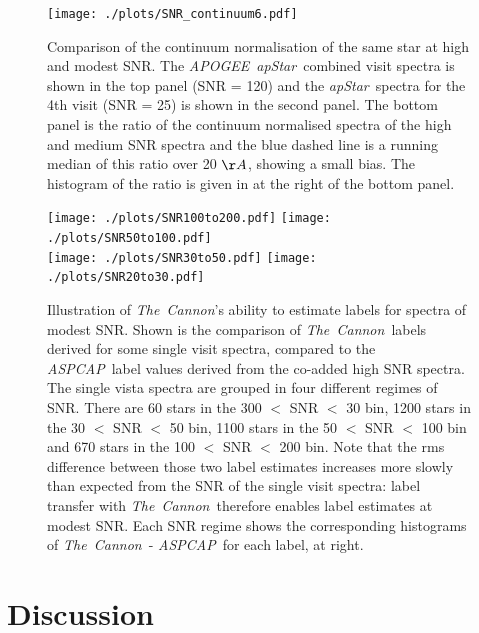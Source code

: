 \documentclass[12pt, preprint]{aastex}
\newcommand{\tc}{\textsl{The~Cannon}}
\newcommand{\apogee}{\textsl{APOGEE}}
\newcommand{\aspcap}{\textsl{ASPCAP}}
\newcommand{\apstar}{\textsl{apStar}}
\begin{document}
 \begin{figure}[!h]
  \texttt{[image: ./plots/SNR\_continuum6.pdf]}
  \caption{Comparison of the continuum normalisation of the same star at high and modest SNR. The \apogee\ \apstar\ combined visit spectra is shown in the top panel (SNR = 120) and the \apstar\ spectra for the 4th visit (SNR = 25) is shown in the second panel. The bottom panel is the ratio of the continuum normalised spectra of the high and medium SNR spectra and the blue dashed line is a running median of this ratio over 20 $\AA$, showing a small bias. The histogram of the ratio is given in at the right of the bottom panel.}
\label{fig:lowsnr}
\end{figure}

\begin{figure}[!h]
\centering
\texttt{[image: ./plots/SNR100to200.pdf]}
\texttt{[image: ./plots/SNR50to100.pdf]}\\
\texttt{[image: ./plots/SNR30to50.pdf]}
\texttt{[image: ./plots/SNR20to30.pdf]}
    \caption{Illustration of \tc's ability to estimate labels for spectra of modest SNR. Shown is the comparison of \tc\ labels derived for some single visit spectra, compared to the \aspcap\ label values derived from the co-added high SNR spectra. The single vista spectra are grouped in four different regimes of SNR. There are 60 stars in the 300 $<$  SNR $<$ 30 bin, 1200 stars in the 30 $<$ SNR $<$ 50 bin, 1100 stars in the 50 $<$ SNR $<$ 100 bin and 670 stars in the 100 $<$  SNR $<$ 200 bin. Note that the rms difference between those two label estimates increases more slowly than expected from the SNR of the single visit spectra: label transfer with \tc\  therefore enables label estimates at modest SNR. Each SNR regime shows the corresponding histograms of \tc\ - \aspcap\ for each label, at right.}
\label{fig:SNR}
\end{figure}

\clearpage
\section{Discussion}
\end{document}

